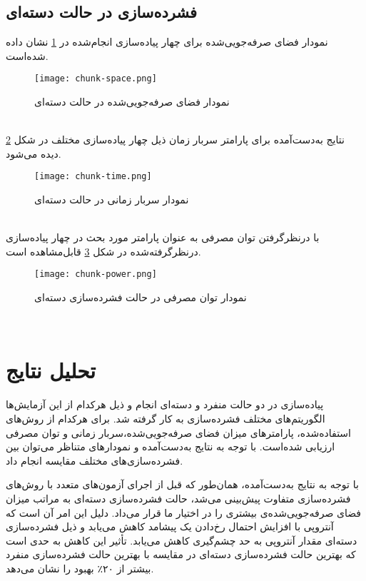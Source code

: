 \subsection{فشرده‌سازی در حالت دسته‌ای}


نمودار فضای صرفه‌جویی‌شده برای چهار پیاده‌سازی انجام‌شده در
\ref{fig:chunk-space}
نشان داده شده‌است.
\begin{figure}[ht]
	\centerline{\texttt{[image: chunk-space.png]}}
	\caption{نمودار فضای صرفه‌جویی‌شده در حالت دسته‌ای}
	\label{fig:chunk-space}
\end{figure}\\

نتایج به‌دست‌آمده برای پارامتر سربار زمان ذیل چهار پیاده‌سازی مختلف در شکل
\ref{fig:chunk-time}
دیده می‌شود.
\begin{figure}[ht]
	\centerline{\texttt{[image: chunk-time.png]}}
	\caption{نمودار سربار زمانی در حالت دسته‌ای}
	\label{fig:chunk-time}
\end{figure}\\

با درنظرگرفتن توان مصرفی به عنوان پارامتر مورد بحث در چهار پیاده‌سازی درنظرگرفته‌شده در شکل
\ref{fig:chunk-power}
قابل‌مشاهده است.
\begin{figure}[ht]
	\centerline{\texttt{[image: chunk-power.png]}}
	\caption{نمودار توان مصرفی در حالت فشرده‌سازی دسته‌ای}
	\label{fig:chunk-power}
\end{figure}\\



\section{تحلیل نتایج}

پیاده‌سازی در دو حالت منفرد و دسته‌ای انجام و ذیل هرکدام از این آزمایش‌ها الگوریتم‌های مختلف فشرده‌سازی به کار گرفته شد. برای هرکدام از روش‌های استفاده‌شده، پارامترهای میزان فضای صرفه‌جویی‌شده،‌سربار زمانی و توان مصرفی ارزیابی شده‌است. با توجه به نتایج به‌دست‌آمده و نمودارهای متناظر می‌توان بین فشرده‌سازی‌های مختلف مقایسه انجام داد. 

با توجه به نتایج به‌دست‌آمده، همان‌طور که قبل از اجرای آزمون‌های متعدد با روش‌های فشرده‌سازی متفاوت پیش‌بینی می‌شد، حالت فشرده‌سازی دسته‌ای به مراتب میزان فضای صرفه‌جویی‌شده‌ی بیشتری را در اختیار ما قرار می‌داد. دلیل این امر آن است که آنتروپی با افزایش احتمال رخ‌دادن یک پیشامد کاهش می‌یابد و ذیل فشرده‌سازی دسته‌ای مقدار آنتروپی به حد چشم‌گیری کاهش می‌یابد. تأثیر این کاهش به حدی ا‌ست که بهترین حالت فشرده‌سازی دسته‌ای در مقایسه با بهترین حالت فشرده‌سازی منفرد بیشتر از ۲۰٪ بهبود را نشان می‌دهد.

